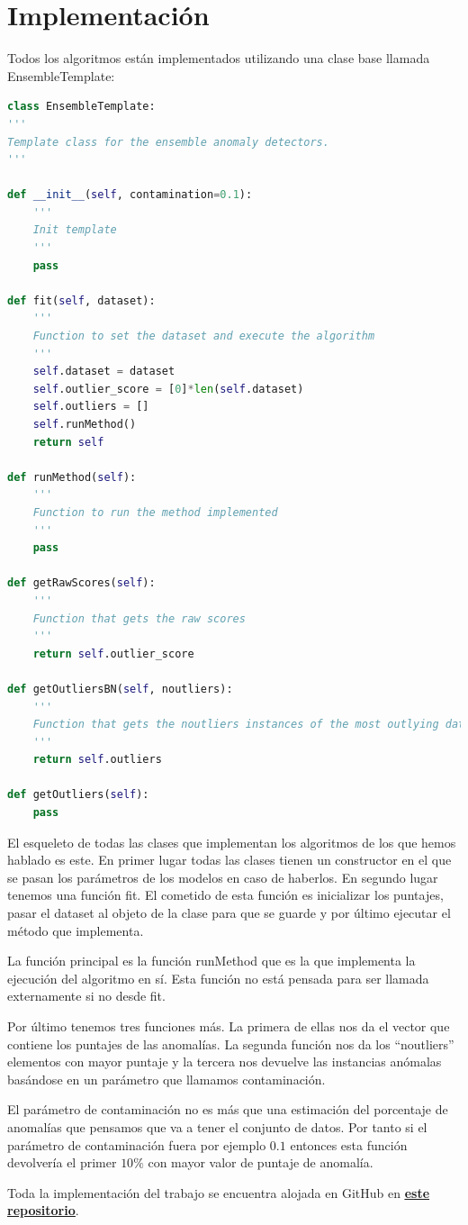 \section{Implementación}

Todos los algoritmos están implementados utilizando una clase base llamada EnsembleTemplate:

\begin{lstlisting}[language=Python]
class EnsembleTemplate:
'''
Template class for the ensemble anomaly detectors.
'''

def __init__(self, contamination=0.1):
	'''
	Init template
	'''
	pass

def fit(self, dataset):
	'''
	Function to set the dataset and execute the algorithm
	'''
	self.dataset = dataset
	self.outlier_score = [0]*len(self.dataset)
	self.outliers = []
	self.runMethod()
	return self

def runMethod(self):
	'''
	Function to run the method implemented
	'''
	pass

def getRawScores(self):
	'''
	Function that gets the raw scores
	'''
	return self.outlier_score

def getOutliersBN(self, noutliers):
	'''
	Function that gets the noutliers instances of the most outlying data
	'''
	return self.outliers

def getOutliers(self):
	pass
\end{lstlisting}

El esqueleto de todas las clases que implementan los algoritmos de los que hemos hablado es este. En primer lugar todas las clases tienen un constructor en el que se pasan los parámetros de los modelos en caso de haberlos. En segundo lugar tenemos una función fit. El cometido de esta función es inicializar los puntajes, pasar el dataset al objeto de la clase para que se guarde y por último ejecutar el método que implementa.

La función principal es la función runMethod que es la que implementa la ejecución del algoritmo en sí. Esta función no está pensada para ser llamada externamente si no desde fit. 

Por último tenemos tres funciones más. La primera de ellas nos da el vector que contiene los puntajes de las anomalías. La segunda función nos da los ``noutliers'' elementos con mayor puntaje y la tercera nos devuelve las instancias anómalas basándose en un parámetro que llamamos contaminación. 

El parámetro de contaminación no es más que una estimación del porcentaje de anomalías que pensamos que va a tener el conjunto de datos. Por tanto si el parámetro de contaminación fuera por ejemplo $0.1$ entonces esta función devolvería el primer $10\%$ con mayor valor de puntaje de anomalía.

Toda la implementación del trabajo se encuentra alojada en GitHub en \href{https://github.com/nacheteam/Ensemble-Outlier-Analysis}{\textbf{\underline{este repositorio}}}.